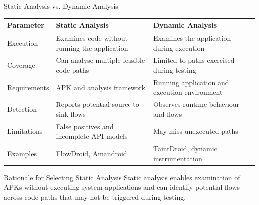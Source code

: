 \documentclass[aspectratio=169,10pt]{beamer}
\newcommand{\tbl}{\footnotesize\setlength{\tabcolsep}{3pt}\renewcommand{\arraystretch}{1.3}}
\begin{document}
\begin{frame}{Static Analysis vs. Dynamic Analysis}

\begin{table}
\centering
\tbl

\begin{tabular}{|L{.17}|L{.38}|L{.38}|}
\hline
\textbf{Parameter} &
\textbf{Static Analysis} &
\textbf{Dynamic Analysis}\\
\hline

Execution &
Examines code without running the application &
Examines the application during execution\\
\hline

Coverage &
Can analyse multiple feasible code paths &
Limited to paths exercised during testing\\
\hline

Requirements &
APK and analysis framework &
Running application and execution environment\\
\hline

Detection &
Reports potential source-to-sink flows &
Observes runtime behaviour and flows\\
\hline

Limitations &
False positives and incomplete API models &
May miss unexecuted paths\\
\hline

Examples &
FlowDroid, Amandroid &
TaintDroid, dynamic instrumentation\\
\hline

\end{tabular}
\end{table}

\begin{block}{Rationale for Selecting Static Analysis}
Static analysis enables examination of APKs without executing system applications and can identify potential flows across code paths that may not be triggered during testing.
\end{block}

\end{frame}

\end{document}
